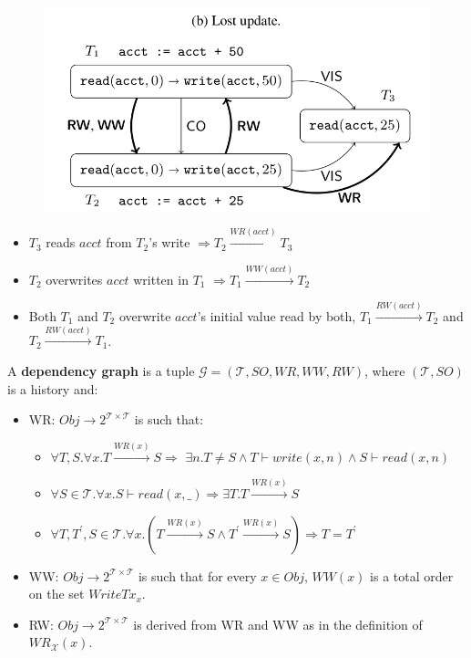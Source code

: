 \documentclass{beamer}
\begin{document}
\begin{frame}
	\begin{figure}
		\includegraphics[scale=0.3]{fig2b}
	\end{figure}
	\begin{example}
		\begin{itemize}
			\item $T_3$ reads $acct$ from $T_2$'s write $\Rightarrow T_2 \xrightarrow{WR(acct)} T_3$
			\item $T_2$ overwrites $acct$ written in $T_1$ $\Rightarrow T_1 \xrightarrow{WW(acct)} T_2$
			\item Both $T_1$ and $T_2$ overwrite $acct$'s initial value read by both, $T_1 \xrightarrow{RW(acct)} T_2$ and $T_2 \xrightarrow{RW(acct)} T_1$.
		\end{itemize}
	\end{example}
\end{frame}

\begin{frame}
	\begin{definition}
		A \textbf{dependency graph} is a tuple $\mathcal{G} = (\mathcal{T}, SO, WR, WW, RW)$, where $(\mathcal{T}, SO)$ is a history and:
		\begin{itemize}
			\item WR: $Obj \rightarrow 2^{\mathcal{T} \times \mathcal{T}}$ is such that:
			\begin{itemize}
				\item $\forall T,S. \forall x . T \xrightarrow{WR(x)}S \Rightarrow $ 
					  $	\exists n. T \ne S \wedge T \vdash write(x,n) \wedge S \vdash read(x,n)$
				\item $\forall S \in \mathcal{T}. \forall x. S \vdash read(x,\_) \Rightarrow \exists T. T \xrightarrow{WR(x)} S $
				\item $\forall T, T^\prime, S \in \mathcal{T}. \forall x. \left( T \xrightarrow{WR(x)} S \wedge T^\prime \xrightarrow{WR(x)} S \right) \Rightarrow T = T^\prime $
			\end{itemize}
		\item WW: $Obj \rightarrow 2^{\mathcal{T} \times \mathcal{T}}$ is such that for every $x \in Obj$, $WW(x)$ is a total order on the set $WriteTx_x$.
		\item RW: $Obj \rightarrow 2^{\mathcal{T} \times \mathcal{T}}$ is derived from WR and WW as in the definition of $WR_\mathcal{X}(x)$.
		\end{itemize}
	\end{definition}
\end{frame}
\end{document}
